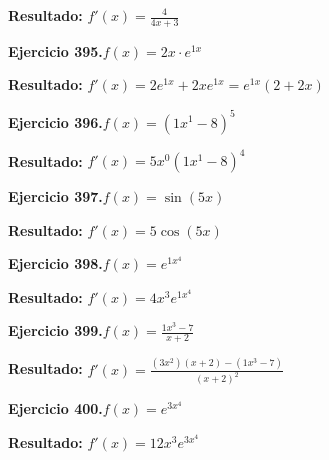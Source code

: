 \documentclass[10pt,a4paper]{article}
\begin{document}
\begin{solbox}
\textbf{Resultado:} \(\displaystyle f'(x) = \frac{4}{4x + 3}\)
\end{solbox}

\begin{ejbox}
\textbf{Ejercicio 395.}\quad $f(x) = 2x \cdot e^{1x}$
\end{ejbox}

\begin{solbox}
\textbf{Resultado:} \(\displaystyle f'(x) = 2e^{1x} + 2xe^{1x} = e^{1x}(2 + 2x)\)
\end{solbox}

\begin{ejbox}
\textbf{Ejercicio 396.}\quad $f(x) = (1x^{1} -8)^{5}$
\end{ejbox}

\begin{solbox}
\textbf{Resultado:} \(\displaystyle f'(x) = 5x^{0}(1x^{1} -8)^{4}\)
\end{solbox}

\newpage
\begin{ejbox}
\textbf{Ejercicio 397.}\quad $f(x) = \sin(5x)$
\end{ejbox}

\begin{solbox}
\textbf{Resultado:} \(\displaystyle f'(x) = 5\cos(5x)\)
\end{solbox}

\begin{ejbox}
\textbf{Ejercicio 398.}\quad $f(x) = e^{1x^{4}}$
\end{ejbox}

\begin{solbox}
\textbf{Resultado:} \(\displaystyle f'(x) = 4x^{3}e^{1x^{4}}\)
\end{solbox}

\begin{ejbox}
\textbf{Ejercicio 399.}\quad $f(x) = \frac{1x^{3} -7}{x + 2}$
\end{ejbox}

\begin{solbox}
\textbf{Resultado:} \(\displaystyle f'(x) = \frac{(3x^{2})(x+2) - (1x^{3} -7)}{(x+2)^2}\)
\end{solbox}

\newpage
\begin{ejbox}
\textbf{Ejercicio 400.}\quad $f(x) = e^{3x^{4}}$
\end{ejbox}

\begin{solbox}
\textbf{Resultado:} \(\displaystyle f'(x) = 12x^{3}e^{3x^{4}}\)
\end{solbox}
\end{document}
